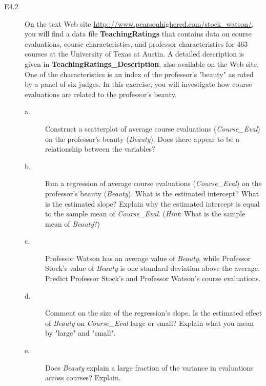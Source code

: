 \documentclass[a4paper,11pt]{article}
\begin{document}
\begin{description}
\item[{E4.2}] On the text Web site
\url{http:://www.pearsonhighered.com/stock\_watson/}, you will find
a data file \textbf{TeachingRatings} that contains data on course
evaluations, course characteristics, and professor
characteristics for 463 courses at the University of Texas
at Austin. A detailed description is given in
\textbf{TeachingRatings\_Description}, also available on the Web
site. One of the characteristics is an index of the
professor's "beauty" as rated by a panel of six judges. In
this exercise, you will investigate how course evaluations
are related to the professor's beauty.
\begin{description}
\item[{a.}] Construct a scatterplot of average course evaluations
(\emph{Course\_Eval}) on the professor's beauty (\emph{Beauty}). Does
there appear to be a relationship between the variables?
\item[{b.}] Run a regression of average course evaluations
(\emph{Course\_Eval}) on the professor's beauty (\emph{Beauty}). What
is the estimated intercept? What is the estimated slope?
Explain why the estimated intercept is equal to the sample
mean of \emph{Course\_Eval}. (\emph{Hint}: What is the sample mean of \emph{Beauty}?)
\item[{c.}] Professor Watson has an average value of \emph{Beauty}, while
Professor Stock's value of \emph{Beauty} is one standard
deviation above the average. Predict Professor Stock's and
Professor Watson's course evaluations.
\item[{d.}] Comment on the size of the regression's slope. Is the
estimated effect of \emph{Beauty} on \emph{Course\_Eval} large or
small? Explain what you mean by "large" and "small".
\item[{e.}] Does \emph{Beauty} explain a large fraction of the variance in
evaluations across courses? Explain.
\end{description}
\end{description}
\end{document}
